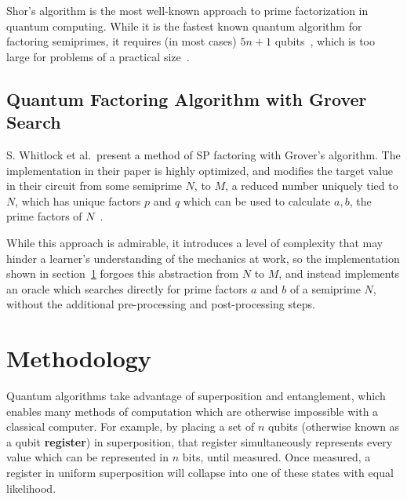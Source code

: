\documentclass[twocolumn]{cinc}
\begin{document}
  Shor's algorithm is the most well-known approach to prime factorization
  in quantum computing. While it is the fastest known quantum algorithm for 
  factoring semiprimes, it requires (in most cases) $5n+1$ qubits~\cite{quantum_fac_efficient},
  which is too large for problems of a practical size~\cite{quantum_factoring,shor}.

  \subsection{Quantum Factoring Algorithm with Grover Search}

  S. Whitlock et al.\ present a method of SP factoring with Grover's
  algorithm. The implementation in their paper is highly optimized,
  and modifies the target value in their circuit from some semiprime $N$,
  to $M$, a reduced number uniquely tied to $N$, which has unique factors 
  $p$ and $q$ which can be used to calculate $a, b$, the prime factors of 
  $N$~\cite{quantum_factoring}. 
  

  While this approach is admirable, it introduces a level of complexity 
  that may hinder a learner's understanding of the mechanics at work,
  so the implementation shown in section\ \ref{sec:Methodology} forgoes
  this abstraction from $N$ to $M$, and instead implements an oracle which
  searches directly for prime factors $a$ and $b$ of a semiprime $N$, without
  the additional pre-processing and post-processing steps.

\section{Methodology}\label{sec:Methodology}

Quantum algorithms take advantage of superposition and entanglement,
which enables many methods of computation which are otherwise impossible
with a classical computer. For example, by placing a set of $n$ qubits 
(otherwise known as a qubit \textbf{register}) in superposition, that register
simultaneously represents every value which can be represented in $n$ bits,
until measured. Once measured, a register in uniform superposition will 
collapse into one of these states with equal likelihood.

%
\end{document}
